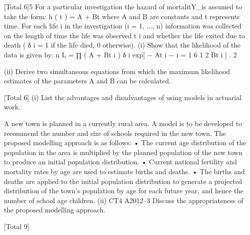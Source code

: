 [Total 6]5
For a particular investigation the hazard of mortalitY_is assumed to take the form:
h ( t ) = A + Bt
where A and B are constants and t represents time.
For each life i in the investigation (i = 1, ..., n) information was collected on the
length of time the life was observed t i and whether the life exited due to death ( δ i = 1
if the life died, 0 otherwise).
(i)
Show that the likelihood of the data is given by:
n
L = ∏ ( A + Bt i ) δ i exp[ − At i −
i = 1
6
1 2
Bt i ] .
2

(ii) Derive two simultaneous equations from which the maximum likelihood
estimates of the parameters A and B can be calculated.

[Total 6]
(i) List the advantages and disadvantages of using models in actuarial work.

A new town is planned in a currently rural area. A model is to be developed to
recommend the number and size of schools required in the new town. The proposed
modelling approach is as follows:
• The current age distribution of the population in the area is multiplied by the
planned population of the new town to produce an initial population distribution.
• Current national fertility and mortality rates by age are used to estimate births and
deaths.
• The births and deaths are applied to the initial population distribution to generate
a projected distribution of the town’s population by age for each future year, and
hence the number of school age children.
(ii)
CT4 A2012–3
Discuss the appropriateness of the proposed modelling approach.

[Total 9]

